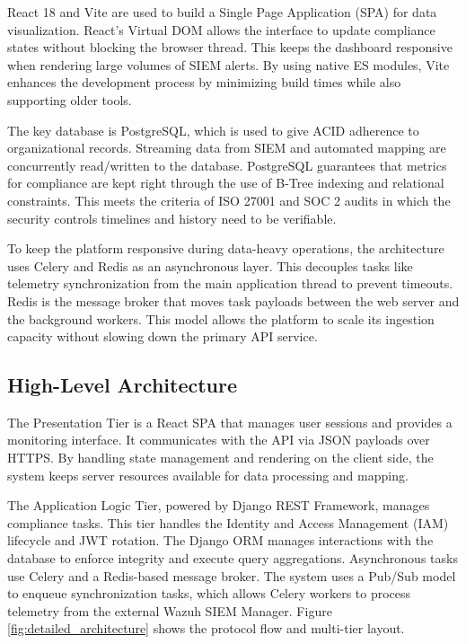 React 18 and Vite are used to build a Single Page Application (SPA) for data visualization. React's Virtual DOM allows the interface to update compliance states without blocking the browser thread. This keeps the dashboard responsive when rendering large volumes of SIEM alerts. By using native ES modules, Vite enhances the development process by minimizing build times while also supporting older tools.

The key database is PostgreSQL, which is used to give ACID adherence to organizational records. Streaming data from SIEM and automated mapping are concurrently read/written to the database. PostgreSQL guarantees that metrics for compliance are kept right through the use of B-Tree indexing and relational constraints. This meets the criteria of ISO 27001 and SOC 2 audits in which the security controls timelines and history need to be verifiable.

To keep the platform responsive during data-heavy operations, the architecture uses Celery and Redis as an asynchronous layer. This decouples tasks like telemetry synchronization from the main application thread to prevent timeouts. Redis is the message broker that moves task payloads between the web server and the background workers. This model allows the platform to scale its ingestion capacity without slowing down the primary API service.

\subsection{High-Level Architecture}
The Presentation Tier is a React SPA that manages user sessions and provides a monitoring interface. It communicates with the API via JSON payloads over HTTPS. By handling state management and rendering on the client side, the system keeps server resources available for data processing and mapping.

The Application Logic Tier, powered by Django REST Framework, manages compliance tasks. This tier handles the Identity and Access Management (IAM) lifecycle and JWT rotation. The Django ORM manages interactions with the database to enforce integrity and execute query aggregations. Asynchronous tasks use Celery and a Redis-based message broker. The system uses a Pub/Sub model to enqueue synchronization tasks, which allows Celery workers to process telemetry from the external Wazuh SIEM Manager. Figure \ref{fig:detailed_architecture} shows the protocol flow and multi-tier layout.

